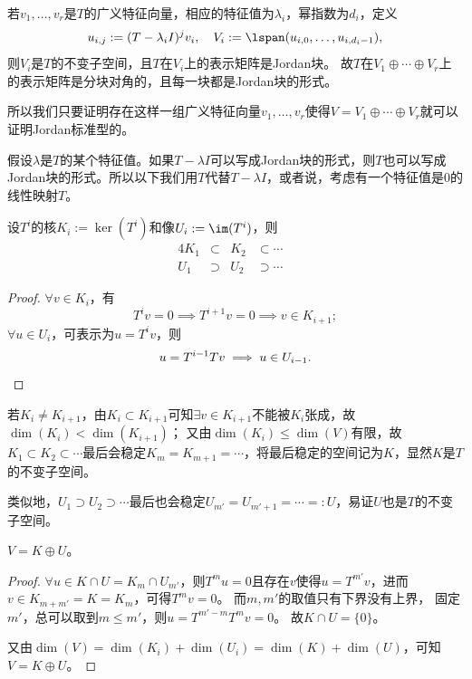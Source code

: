 \begin{corollary}
	若$v_1,\ldots,v_r$是$T$的广义特征向量，相应的特征值为$\lambda_i$，幂指数为$d_i$，定义
	\[
		u_{i,j}:=(T-\lambda_iI)^jv_i,\quad V_i:=\lspan(u_{i,0},\ldots,u_{i,d_i-1}),
	\]
	则$V_i$是$T$的不变子空间，且$T$在$V_i$上的表示矩阵是Jordan块。
	故$T$在$V_1\oplus\cdots\oplus V_r$上的表示矩阵是分块对角的，且每一块都是Jordan块的形式。

	所以我们只要证明存在这样一组广义特征向量$v_1,\ldots,v_r$使得$V=V_1\oplus\cdots\oplus V_r$就可以证明Jordan标准型的。
\end{corollary}

\begin{remark}
	假设$\lambda$是$T$的某个特征值。如果$T-\lambda I$可以写成Jordan块的形式，则$T$也可以写成Jordan块的形式。所以以下我们用$T$代替$T-\lambda I$，或者说，考虑有一个特征值是0的线性映射$T$。
\end{remark}

\begin{theorem}{}{}
	设$T^i$的核$K_i:=\ker(T^i)$和像$U_i:=\im(T^i)$，则
	\begin{alignat*}{4}
		K_1&\subset{}&K_2&\subset\cdots&\\
		U_1&\supset{}&U_2&\supset\cdots&
	\end{alignat*}
\end{theorem}

\begin{proof}
	$\forall v\in K_i$，有 
	\[
		T^iv=0\implies T^{i+1}v=0\implies v\in K_{i+1};
	\]
	$\forall u\in U_i$，可表示为$u=T^iv$，则
	\[
		u=T^{i-1}Tv\implies u\in U_{i-1}.
		\qedhere
	\]
\end{proof} 

\begin{corollary}
	若$K_i\neq K_{i+1}$，由$K_i\subset K_{i+1}$可知$\exists v\in K_{i+1}$不能被$K_i$张成，故$\dim(K_i)<\dim(K_{i+1})$；
	又由$\dim(K_i)\leq \dim(V)$有限，故$K_1\subset K_2\subset\cdots$最后会稳定$K_m=K_{m+1}=\cdots$，将最后稳定的空间记为$K$，显然$K$是$T$的不变子空间。

	类似地，$U_1\supset U_2\supset\cdots$最后也会稳定$U_{m'}=U_{m'+1}=\cdots=:U$，易证$U$也是$T$的不变子空间。
\end{corollary}

\begin{theorem}
	{}{}
	$V=K\oplus U$。
\end{theorem}

\begin{proof}
	$\forall u\in K\cap U=K_m\cap U_{m'}$，则$T^mu=0$且存在$v$使得$u=T^{m'}v$，进而$v\in K_{m+m'}=K=K_m$，可得$T^mv=0$。
	而$m,m'$的取值只有下界没有上界，
	固定$m'$，总可以取到$m\leq m'$，则$u=T^{m'-m}T^mv=0$。
	故$K\cap U=\{0\}$。

	又由$\dim(V)=\dim(K_i)+\dim(U_i)=\dim(K)+\dim(U)$，可知$V=K\oplus U$。
\end{proof}

